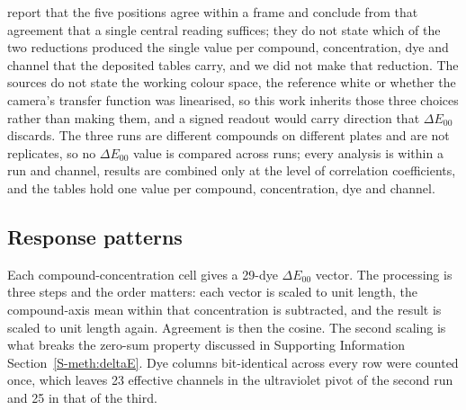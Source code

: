 \documentclass[journal=jacsat,manuscript=article,margin=1in]{achemso}
\begin{document}
report that the five positions agree within a frame and conclude from that
agreement that a single central reading suffices; they do not state which of
the two reductions produced the single value per compound, concentration, dye
and channel that the deposited tables carry, and we did not make that
reduction. The sources do not state the working colour space, the
reference white or whether the camera's transfer function was linearised, so
this work inherits those three choices rather than making them, and a signed
readout would carry direction that $\Delta E_{00}$ discards. The three runs are
different compounds on different plates and are not replicates, so no
$\Delta E_{00}$ value is compared across runs; every analysis is within a run
and channel, results are combined only at the level of correlation
coefficients, and the tables hold one value per compound, concentration, dye
and channel.

\subsection{Response patterns}
\label{meth:patterns}
Each compound-concentration cell gives a 29-dye $\Delta E_{00}$ vector. The
processing is three steps and the order matters: each vector is scaled to
unit length, the compound-axis mean within that concentration is subtracted,
and the result is scaled to unit length again. Agreement is then the cosine.
The second scaling is what breaks the zero-sum property discussed in
Supporting Information Section~\ref{S-meth:deltaE}. Dye columns bit-identical
across every row were counted once, which leaves 23 effective channels in the
ultraviolet pivot of the second run and 25 in that of the third.
\end{document}
